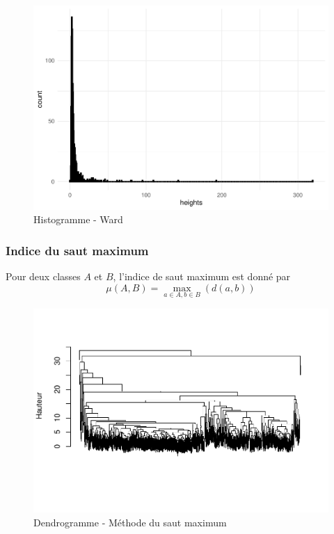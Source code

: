 \documentclass[
]{article}
\begin{document}
\begin{figure}[H]

{\centering \includegraphics{ADM_DM2_EL_MAZZOUJI_Wahel_GILLET_Louison_files/figure-latex/HistogrammeWard-1} 

}

\caption{Histogramme - Ward}\label{fig:HistogrammeWard}
\end{figure}

\hypertarget{indice-du-saut-maximum}{%
\subsubsection{Indice du saut maximum}\label{indice-du-saut-maximum}}

Pour deux classes \(A\) et \(B\), l'indice de saut maximum est donné par
\[
  \mu(A, B) = \max_{a \in A, b \in B} \left(d(a, b) \right)
\]

\begin{figure}[H]

{\centering \includegraphics{ADM_DM2_EL_MAZZOUJI_Wahel_GILLET_Louison_files/figure-latex/DendrogrammeMax-1} 

}

\caption{Dendrogramme - Méthode du saut maximum}\label{fig:DendrogrammeMax}
\end{figure}
\end{document}
